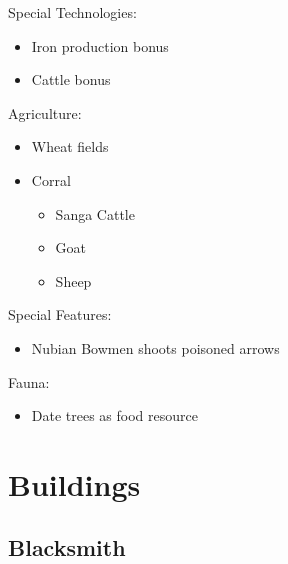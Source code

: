 \documentclass[a4paper,12pt]{scrreprt}
\begin{document}
Special Technologies:

\begin{itemize}
	\item Iron production bonus
	\item Cattle bonus
\end{itemize}

Agriculture:

\begin{itemize}
	\item Wheat fields
	\item Corral
	\begin{itemize}
		\item Sanga Cattle
		\item Goat
		\item Sheep
	\end{itemize}
\end{itemize}
Special Features:

\begin{itemize}
	\item Nubian Bowmen shoots poisoned arrows
\end{itemize}

Fauna:

\begin{itemize}
	\item Date trees as food resource
\end{itemize}

\section{Buildings}

\subsection{Blacksmith}
\end{document}
